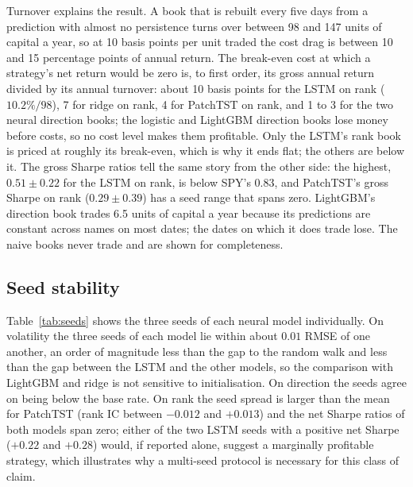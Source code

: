 \documentclass[10pt,a4paper,twoside,twocolumn]{article}
\begin{document}
Turnover explains the result. A book that is rebuilt every five days from a prediction with almost no persistence turns over between 98 and 147 units of capital a year, so at 10 basis points per unit traded the cost drag is between 10 and 15 percentage points of annual return. The break-even cost at which a strategy's net return would be zero is, to first order, its gross annual return divided by its annual turnover: about 10 basis points for the LSTM on rank ($10.2\%/98$), 7 for ridge on rank, 4 for PatchTST on rank, and 1 to 3 for the two neural direction books; the logistic and LightGBM direction books lose money before costs, so no cost level makes them profitable. Only the LSTM's rank book is priced at roughly its break-even, which is why it ends flat; the others are below it. The gross Sharpe ratios tell the same story from the other side: the highest, $0.51\pm0.22$ for the LSTM on rank, is below SPY's $0.83$, and PatchTST's gross Sharpe on rank ($0.29\pm0.39$) has a seed range that spans zero. LightGBM's direction book trades 6.5 units of capital a year because its predictions are constant across names on most dates; the dates on which it does trade lose. The naive books never trade and are shown for completeness.

\subsection{Seed stability}

\begin{table}[t]
\centering\small
\caption{Pooled primary metric and net Sharpe ratio by seed for the two neural models.}
\label{tab:seeds}

\end{table}

Table~\ref{tab:seeds} shows the three seeds of each neural model individually. On volatility the three seeds of each model lie within about $0.01$ RMSE of one another, an order of magnitude less than the gap to the random walk and less than the gap between the LSTM and the other models, so the comparison with LightGBM and ridge is not sensitive to initialisation. On direction the seeds agree on being below the base rate. On rank the seed spread is larger than the mean for PatchTST (rank IC between $-0.012$ and $+0.013$) and the net Sharpe ratios of both models span zero; either of the two LSTM seeds with a positive net Sharpe ($+0.22$ and $+0.28$) would, if reported alone, suggest a marginally profitable strategy, which illustrates why a multi-seed protocol is necessary for this class of claim.
\end{document}
